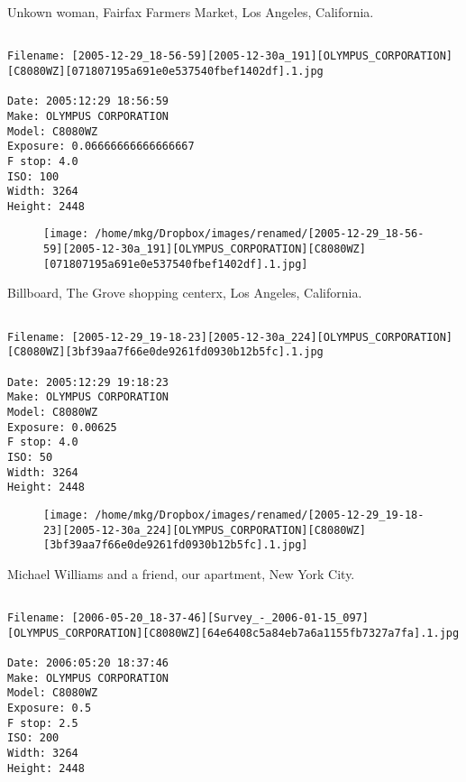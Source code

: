 \clearpage
\onecolumn
\noindent Unkown woman, Fairfax Farmers Market, Los Angeles, California.
\noindent
\begin{lstlisting}

Filename: [2005-12-29_18-56-59][2005-12-30a_191][OLYMPUS_CORPORATION][C8080WZ][071807195a691e0e537540fbef1402df].1.jpg

Date: 2005:12:29 18:56:59
Make: OLYMPUS CORPORATION
Model: C8080WZ
Exposure: 0.06666666666666667
F stop: 4.0
ISO: 100
Width: 3264
Height: 2448
\end{lstlisting}
\clearpage

\begin{figure}
\texttt{[image: /home/mkg/Dropbox/images/renamed/[2005-12-29\_18-56-59][2005-12-30a\_191][OLYMPUS\_CORPORATION][C8080WZ][071807195a691e0e537540fbef1402df].1.jpg]}
\end{figure}
    
\clearpage
\onecolumn
\noindent Billboard, The Grove shopping centerx, Los Angeles, California.
\noindent
\begin{lstlisting}

Filename: [2005-12-29_19-18-23][2005-12-30a_224][OLYMPUS_CORPORATION][C8080WZ][3bf39aa7f66e0de9261fd0930b12b5fc].1.jpg

Date: 2005:12:29 19:18:23
Make: OLYMPUS CORPORATION
Model: C8080WZ
Exposure: 0.00625
F stop: 4.0
ISO: 50
Width: 3264
Height: 2448
\end{lstlisting}
\clearpage

\begin{figure}
\texttt{[image: /home/mkg/Dropbox/images/renamed/[2005-12-29\_19-18-23][2005-12-30a\_224][OLYMPUS\_CORPORATION][C8080WZ][3bf39aa7f66e0de9261fd0930b12b5fc].1.jpg]}
\end{figure}
    
\clearpage
\onecolumn
\noindent Michael Williams and a friend, our apartment, New York City.
\noindent
\begin{lstlisting}

Filename: [2006-05-20_18-37-46][Survey_-_2006-01-15_097][OLYMPUS_CORPORATION][C8080WZ][64e6408c5a84eb7a6a1155fb7327a7fa].1.jpg

Date: 2006:05:20 18:37:46
Make: OLYMPUS CORPORATION
Model: C8080WZ
Exposure: 0.5
F stop: 2.5
ISO: 200
Width: 3264
Height: 2448
\end{lstlisting}
\clearpage

